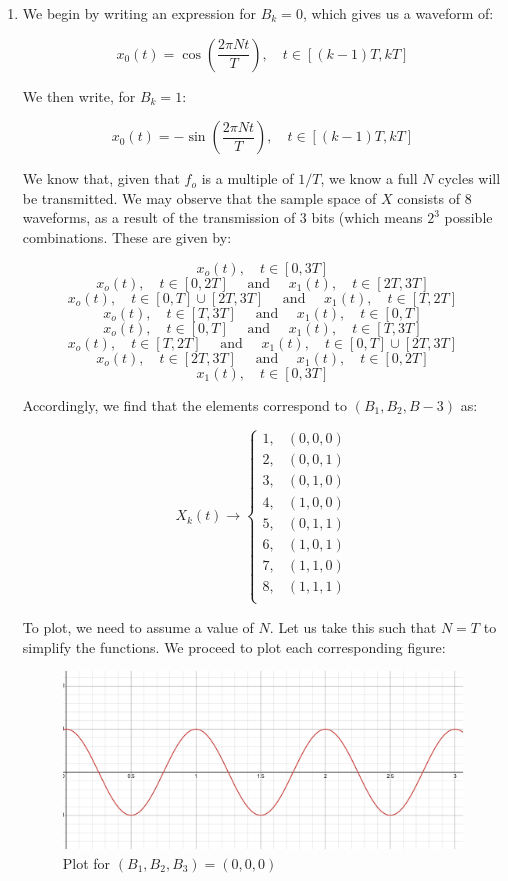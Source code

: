 \begin{enumerate}

  \item We begin by writing an expression for $B_k=0$, which gives us a waveform of:

    $$x_0(t)=\cos\left( \frac{2\pi N t}{T} \right),\quad t\in[(k-1)T,kT]$$

    We then write, for $B_k=1$:

    $$x_0(t)=-\sin\left( \frac{2\pi N t}{T} \right),\quad t\in[(k-1)T,kT]$$

    We know that, given that $f_o$ is a multiple of $1/T$, we know a full $N$ cycles will be transmitted. We may observe that the sample space of $X$ consists of $8$ waveforms, as a result of the transmission of 3 bits (which means $2^3$ possible combinations. These are given by:

      $$x_o(t),\quad t\in[0,3T]$$
      $$x_o(t),\quad t\in[0,2T]\quad\text{ and }\quad x_1(t),\quad t\in[2T,3T]$$
      $$x_o(t),\quad t\in[0,T]\cup[2T,3T]\quad\text{ and }\quad x_1(t),\quad t\in[T,2T]$$
      $$x_o(t),\quad t\in[T,3T]\quad\text{ and }\quad x_1(t),\quad t\in[0,T]$$
      $$x_o(t),\quad t\in[0,T]\quad\text{ and }\quad x_1(t),\quad t\in[T,3T]$$
      $$x_o(t),\quad t\in[T,2T]\quad\text{ and }\quad x_1(t),\quad t\in[0,T]\cup[2T,3T]$$
      $$x_o(t),\quad t\in[2T,3T]\quad\text{ and }\quad x_1(t),\quad t\in[0,2T]$$
      $$x_1(t),\quad t\in[0,3T]$$

      Accordingly, we find that the elements correspond to $(B_1,B_2,B-3)$ as:

      $$X_k(t)\to\left\{\begin{array}{ll} 1, & (0,0,0)\\ 2, & (0,0,1)\\3, & (0,1,0)\\4, & (1,0,0)\\5, & (0,1,1)\\6, & (1,0,1)\\7, & (1,1,0)\\8, & (1,1,1)\\\end{array}$$

        To plot, we need to assume a value of $N$. Let us take this such that $N=T$ to simplify the functions. We proceed to plot each corresponding figure:

        \begin{figure}[H]
          \centering
          \includegraphics[width=.75\textwidth]{Figures/HW10-1a}
          \caption{Plot for $(B_1,B_2,B_3)=(0,0,0)$}
          \label{fig:1}
        \end{figure}


\end{enumerate}
